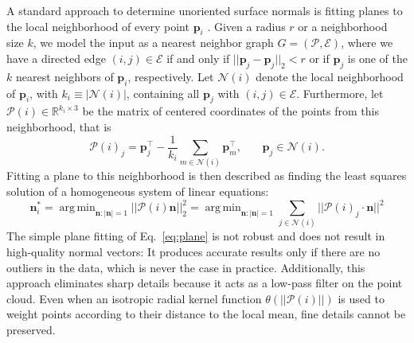 \documentclass[10pt,twocolumn,letterpaper]{article}
\DeclareMathOperator*{\argmin}{arg\,min}
\begin{document}
A standard approach to determine unoriented surface normals is fitting planes to the local neighborhood of every point $\mathbf{p}_i$ \cite{Levin:1998}. Given a radius $r$ or a neighborhood size $k$, we model the input as a nearest neighbor graph $G=(\mathcal{P}, \mathcal{E})$, where we have a directed edge $(i,j) \in \mathcal{E}$ if and only if $||\mathbf{p}_j - \mathbf{p}_j||_2 < r$ or if $\mathbf{p}_j$ is one of the $k$ nearest neighbors of $\mathbf{p}_i$, respectively. Let $\mathcal{N}(i)$ denote the local neighborhood of $\mathbf{p}_i$, with $k_i \equiv |\mathcal{N}(i)|$, containing all $\mathbf{p}_j$ with $(i,j) \in \mathcal{E}$. Furthermore, let $\mathcal{P}(i) \in \mathbb{R}^{k_i \times 3}$ be the matrix of centered coordinates of the points from this neighborhood, that is 
\begin{equation}
    \mathcal{P}(i)_j = \mathbf{p}_j^\top - \frac{1}{k_i} \sum_{m\in\mathcal{N}(i)} \mathbf{p}_m^\top \textrm{,}\qquad \mathbf{p}_j \in \mathcal{N}(i).
\end{equation}
Fitting a plane to this neighborhood is then described as finding the least squares solution of a homogeneous system of linear equations:
\begin{equation}
    \mathbf{n}_i^\ast = \argmin_{\mathbf{n}:|\mathbf{n}|=1} 
    || \mathcal{P}(i) \mathbf{n} ||^2_2 =
    \argmin_{\mathbf{n}:|\mathbf{n}|=1} \sum_{j\in\mathcal{N}(i)}  || \mathcal{P}(i)_j\cdot \mathbf{n} ||^2
    \label{eq:plane}
\end{equation}
The simple plane fitting of Eq.~\ref{eq:plane} is not robust and does not result 
in high-quality normal vectors: It produces accurate results only if there are no outliers 
in the data, which is never the case in practice. Additionally, this approach eliminates sharp details because it 
acts as a low-pass filter on the point cloud. 
Even when an isotropic radial kernel function $\theta(||\mathcal{P}(i)||)$ is used
to weight points according to their distance to the local mean, fine details cannot be
preserved.
\end{document}

